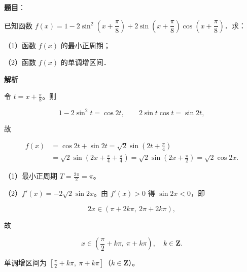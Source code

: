 \begin{answer}

\textbf{题目}：

已知函数 $f(x)=1-2\sin^2\left(x+\dfrac{\pi}{8}\right)+2\sin\left(x+\dfrac{\pi}{8}\right)\cos\left(x+\dfrac{\pi}{8}\right)$．求：

（1）函数 $f(x)$ 的最小正周期；

（2）函数 $f(x)$ 的单调增区间．

\textbf{解析}

令 $t=x+\frac{\pi}{8}$。则

\nopagebreak[4]
\[1-2\sin^2t=\cos2t,\qquad 2\sin t\cos t=\sin2t,\]

故

\nopagebreak[4]
\[
\begin{aligned}
f(x)&=\cos2t+\sin2t=\sqrt2\sin\left(2t+\frac{\pi}{4}\right)\\
&=\sqrt2\sin\left(2x+\frac{\pi}{4}+\frac{\pi}{4}\right)
=\sqrt2\sin\left(2x+\frac{\pi}{2}\right)=\sqrt2\cos2x .
\end{aligned}
\]

（1）最小正周期 $T=\frac{2\pi}{2}=\pi$。

（2）$f'(x)=-2\sqrt2\sin2x$。由 $f'(x)>0$ 得 $\sin2x<0$，即

\nopagebreak[4]
\[2x\in(\pi+2k\pi,\ 2\pi+2k\pi),\]

故

\nopagebreak[4]
\[x\in\left(\frac{\pi}{2}+k\pi,\ \pi+k\pi\right),\quad k\in\mathbf Z .\]

单调增区间为 $\left[\frac{\pi}{2}+k\pi,\ \pi+k\pi\right]$（$k\in\mathbf Z$）。


\end{answer}

